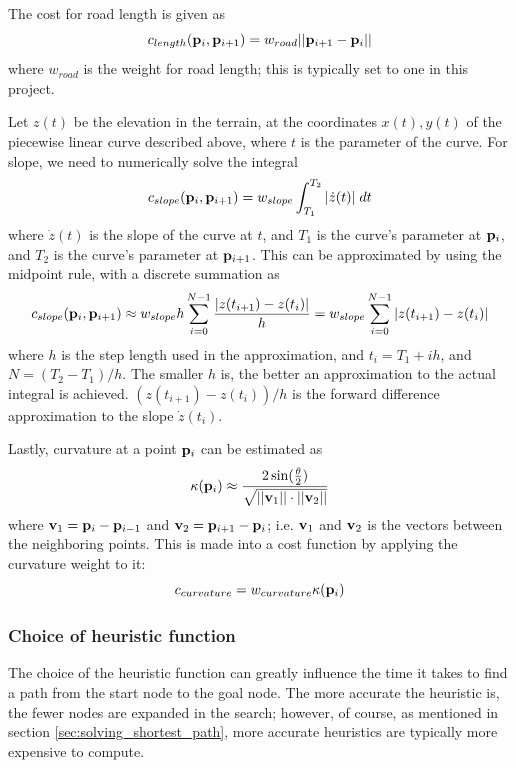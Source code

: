 The cost for road length is given as 
$$
c_{length}({\mathbf p}_i, {\mathbf p}_{i+1}) = w_{road}||{\mathbf p}_{i+1} - {\mathbf p}_i||
$$
where $w_{road}$ is the weight for road length; this is typically set to one in this project. 

Let $z(t)$ be the elevation in the terrain, at the coordinates $x(t), y(t)$ of the piecewise linear curve described above, where $t$ is the parameter of the curve. For slope, we need to numerically solve the integral
$$
c_{slope}({\mathbf p}_i, {\mathbf p}_{i+1}) = w_{slope}\int_{T_1}^{T_2} |\dot{z}(t)|\; dt
$$
where $\dot{z}(t)$ is the slope of the curve at $t$, and $T_1$ is the curve's parameter at ${\mathbf p}_i$, and $T_2$ is the curve's parameter at ${\mathbf p}_{i+1}$. This can be approximated by using the midpoint rule, with a discrete summation as
$$
c_{slope}({\mathbf p}_i, {\mathbf p}_{i+1}) \approx w_{slope}h\sum_{i=0}^{N-1} \frac{|z(t_{i+1})-z(t_i)|}{h} = w_{slope}\sum_{i=0}^{N-1} |z(t_{i+1})-z(t_i)|
$$
where $h$ is the step length used in the approximation, and $t_i=T_1+ih$, and $N=(T_2-T_1)/h$. The smaller $h$ is, the better an approximation to the actual integral is achieved. $(z(t_{i+1})-z(t_i))/h$ is the forward difference approximation to the slope $\dot{z}(t_i)$.

Lastly, curvature at a point ${\mathbf p}_i$ can be estimated as\cite{clothoid3}
$$
\kappa({\mathbf p}_i) \approx \frac{2\sin(\frac{\theta}{2})}{\sqrt{||{\mathbf v}_1||\cdot ||{\mathbf v}_2||}}
$$
where ${\mathbf v}_1 = {\mathbf p}_i-{\mathbf p}_{i-1}$ and ${\mathbf v}_2 = {\mathbf p}_{i+1}-{\mathbf p}_i$; i.e. ${\mathbf v}_1$ and ${\mathbf v}_2$ is the vectors between the neighboring points. This is made into a cost function by applying the curvature weight to it:
$$
c_{curvature} = w_{curvature}\kappa({\mathbf p}_i)
$$

\subsubsection{Choice of heuristic function}
The choice of the heuristic function can greatly influence the time it takes to find a path from the start node to the goal node. The more accurate the heuristic is, the fewer nodes are expanded in the search; however, of course, as mentioned in section \ref{sec:solving_shortest_path}, more accurate heuristics are typically more expensive to compute.

